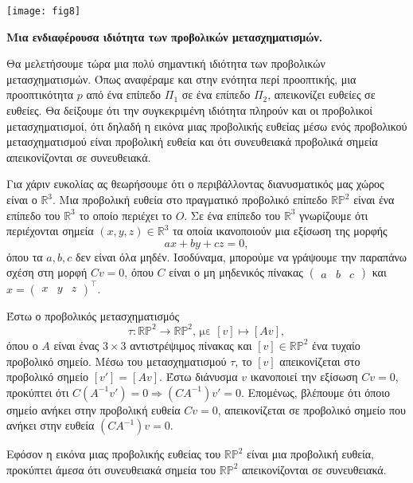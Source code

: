 \documentclass[12pt, a4paper]{book}
\begin{document}
\begin{center}
\texttt{[image: fig8]}
\end{center}

\textbf{Μια ενδιαφέρουσα ιδιότητα των προβολικών μετασχηματισμών.}

Θα μελετήσουμε τώρα μια πολύ σημαντική ιδιότητα των προβολικών μετασχηματισμών. Όπως αναφέραμε και στην ενότητα περί προοπτικής, μια προοπτικότητα $p$ από ένα επίπεδο $Π_1$ σε ένα επίπεδο $Π_2$, απεικονίζει ευθείες σε ευθείες. Θα δείξουμε ότι την συγκεκριμένη ιδιότητα πληρούν και οι προβολικοί μετασχηματισμοί, ότι δηλαδή η εικόνα μιας προβολικής ευθείας μέσω ενός προβολικού μετασχηματισμού είναι προβολική ευθεία και ότι συνευθειακά προβολικά σημεία απεικονίζονται σε συνευθειακά.

Για χάριν ευκολίας ας θεωρήσουμε ότι ο περιβάλλοντας διανυσματικός μας χώρος είναι ο $\mathbb{R}^3$. Μια προβολική ευθεία στο πραγματικό προβολικό επίπεδο $\mathbb{R}\mathbb{P}^2$ είναι ένα επίπεδο του $\mathbb{R}^3$ το οποίο περιέχει το $Ο$. Σε ένα επίπεδο του $\mathbb{R}^3$ γνωρίζουμε ότι περιέχονται σημεία $(x,y,z) \in \mathbb{R}^3$ τα οποία ικανοποιούν μια εξίσωση της μορφής
\begin{displaymath}
ax+by+cz=0,
\end{displaymath}
όπου τα $a,b,c$ δεν είναι όλα μηδέν. Ισοδύναμα, μπορούμε να γράψουμε την παραπάνω σχέση στη μορφή $Cv =0 $, όπου $C$ είναι ο μη μηδενικός πίνακας $\begin{pmatrix}a&b&c \end{pmatrix}$ και $x = \begin{pmatrix}x&y&z \end{pmatrix}^\intercal$. 

Έστω ο προβολικός μετασχηματισμός 
\begin{displaymath}
τ : \mathbb{R}\mathbb{P}^2 \rightarrow \mathbb{R}\mathbb{P}^2 \text{, με } [v] \mapsto [Av],
\end{displaymath}
όπου ο $Α$ είναι ένας $3\times3$  αντιστρέψιμος πίνακας και $[v] \in \mathbb{R}\mathbb{P}^2$ ένα τυχαίο προβολικό σημείο. Μέσω του μετασχηματισμού $τ$, το $[v]$ απεικονίζεται στο προβολικό σημείο $[v'] = [Av]$. Έστω διάνυσμα $v$ ικανοποιεί την εξίσωση $Cv =0$, προκύπτει ότι $C(A^{-1}v') =0 \Rightarrow (CA^{-1})v'=0$. Επομένως, βλέπουμε ότι όποιο σημείο ανήκει στην προβολική ευθεία  $Cv =0 $,  απεικονίζεται σε προβολικό σημείο που ανήκει στην ευθεία $(CA^{-1})v =0$.

Εφόσον η εικόνα μιας προβολικής ευθείας του $\mathbb{R}\mathbb{P}^2$ είναι μια προβολική ευθεία, προκύπτει άμεσα ότι συνευθειακά σημεία του $\mathbb{R}\mathbb{P}^2$ απεικονίζονται σε συνευθειακά.
\end{document}
